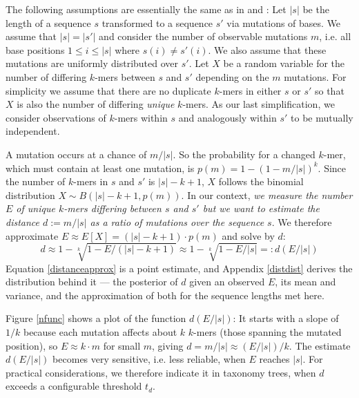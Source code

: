 \documentclass[pdflatex,sn-vancouver-num]{sn-jnl}
\begin{document}
The following assumptions are essentially the same as in \cite{skmer} and \cite{Ondov:2016aa}:
    Let $|s|$ be the length of a sequence $s$ transformed to a sequence $s'$ via mutations of bases. We assume that $|s| = |s'|$ and consider the number of observable mutations $m$, i.e. all base positions $1 \leq i \leq |s|$ where $s(i) \neq s'(i)$. We also assume that these mutations are uniformly distributed over $s'$.
    Let $X$ be a random variable for the number of differing $k$-mers between $s$ and $s'$ depending on the $m$ mutations. For simplicity we assume that there are no duplicate $k$-mers in either $s$ or $s'$ so that $X$ is also the number of differing \emph{unique} $k$-mers. As our last simplification, we consider observations of $k$-mers within $s$ and analogously within $s'$ to be mutually independent. 

    A mutation occurs at a chance of $m/|s|$. So the probability for a changed $k$-mer, which must contain at least one mutation, is $p(m) = 1 - (1 - m/|s|)^k$. Since the number of $k$-mers in $s$ and $s'$ is $|s|-k+1$, $X$ follows the binomial distribution $X \sim B(|s|-k+1, p(m))$.         
    In our context, \emph{we measure the number $E$ of unique $k$-mers differing between $s$ and $s'$ but we want to estimate the distance $d:=m/|s|$ as a ratio of mutations over the sequence $s$}. We therefore approximate $E \approx E[X] = (|s|-k+1) \cdot p(m)$ and solve by $d$:
 \begin{equation}
d \approx 1 - \sqrt[k]{1 - E / (|s| - k + 1)} \approx 1 - \sqrt[k]{1 - E / |s|} =: d(E/|s|)\label{distanceapprox} 	
 \end{equation} 
Equation \eqref{distanceapprox} is a point estimate, and Appendix \ref{distdist} derives the
distribution behind it --- the posterior of $d$ given an observed $E$, its mean and variance, and the
approximation of both for the sequence lengths met here.

Figure \ref{nfunc} shows a plot of the function $d(E/|s|)$: It starts with a slope of $1/k$ because each mutation affects about $k$ $k$-mers (those spanning the mutated position), so $E \approx k \cdot m$ for small $m$, giving $d = m/|s| \approx (E/|s|)/k$. The estimate $d(E/|s|)$ becomes very sensitive, i.e. less reliable, when $E$ reaches $|s|$. For practical considerations, we therefore indicate it in taxonomy trees, when $d$ exceeds a configurable threshold $t_d$.
\end{document}
